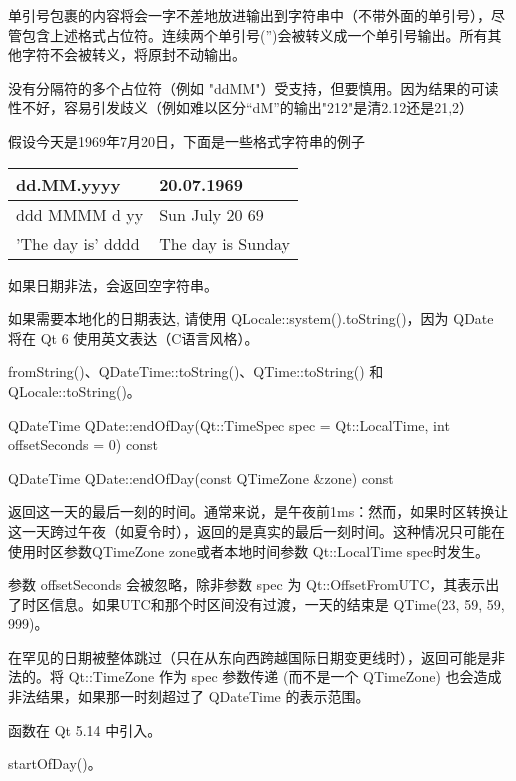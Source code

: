 单引号包裹的内容将会一字不差地放进输出到字符串中（不带外面的单引号），尽管包含上述格式占位符。连续两个单引号('')会被转义成一个单引号输出。所有其他字符不会被转义，将原封不动输出。

没有分隔符的多个占位符（例如 "ddMM"）受支持，但要慎用。因为结果的可读性不好，容易引发歧义（例如难以区分“dM”的输出"212"是清2.12还是21,2）

假设今天是1969年7月20日，下面是一些格式字符串的例子

\begin{tabular}{|l|l|}
\hline
dd.MM.yyyy	&20.07.1969\\
\hline
ddd MMMM d yy&	Sun July 20 69\\
\hline
'The day is' dddd&	The day is Sunday\\
\hline
\end{tabular}

如果日期非法，会返回空字符串。


\begin{notice}
如果需要本地化的日期表达, 请使用 QLocale::system().toString()，因为 QDate 将在 Qt 6 使用英文表达（C语言风格）。
\end{notice}


\begin{notice}[另请参阅]
fromString()、QDateTime::toString()、QTime::toString() 和
QLocale::toString()。
\end{notice}


\splitLine

QDateTime QDate::endOfDay(Qt::TimeSpec spec = Qt::LocalTime, int offsetSeconds = 0) const

QDateTime QDate::endOfDay(const QTimeZone \&zone) const

返回这一天的最后一刻的时间。通常来说，是午夜前1ms：然而，如果时区转换让这一天跨过午夜（如夏令时），返回的是真实的最后一刻时间。这种情况只可能在使用时区参数QTimeZone zone或者本地时间参数 Qt::LocalTime spec时发生。

参数 offsetSeconds 会被忽略，除非参数 spec 为 Qt::OffsetFromUTC，其表示出了时区信息。如果UTC和那个时区间没有过渡，一天的结束是 QTime(23, 59, 59, 999)。

在罕见的日期被整体跳过（只在从东向西跨越国际日期变更线时），返回可能是非法的。将 Qt::TimeZone 作为 spec 参数传递 (而不是一个 QTimeZone) 也会造成非法结果，如果那一时刻超过了 QDateTime 的表示范围。

函数在 Qt 5.14 中引入。


\begin{notice}[另请参阅]
startOfDay()。
\end{notice}

